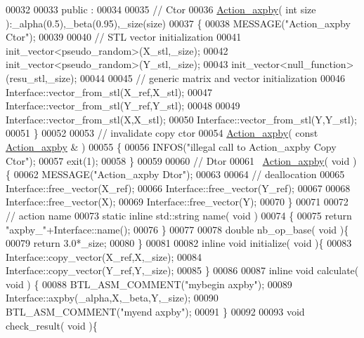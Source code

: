 \begin{DoxyCode}
00032 
00033 public :
00034 
00035   \textcolor{comment}{// Ctor}
00036   \hyperlink{class_action__axpby}{Action\_axpby}( \textcolor{keywordtype}{int} size ):\_alpha(0.5),\_beta(0.95),\_size(size)
00037   \{
00038     MESSAGE(\textcolor{stringliteral}{"Action\_axpby Ctor"});
00039 
00040     \textcolor{comment}{// STL vector initialization}
00041     init\_vector<pseudo\_random>(X\_stl,\_size);
00042     init\_vector<pseudo\_random>(Y\_stl,\_size);
00043     init\_vector<null\_function>(resu\_stl,\_size);
00044 
00045     \textcolor{comment}{// generic matrix and vector initialization}
00046     Interface::vector\_from\_stl(X\_ref,X\_stl);
00047     Interface::vector\_from\_stl(Y\_ref,Y\_stl);
00048 
00049     Interface::vector\_from\_stl(X,X\_stl);
00050     Interface::vector\_from\_stl(Y,Y\_stl);
00051   \}
00052 
00053   \textcolor{comment}{// invalidate copy ctor}
00054   \hyperlink{class_action__axpby}{Action\_axpby}( \textcolor{keyword}{const}  \hyperlink{class_action__axpby}{Action\_axpby} & )
00055   \{
00056     INFOS(\textcolor{stringliteral}{"illegal call to Action\_axpby Copy Ctor"});
00057     exit(1);
00058   \}
00059 
00060   \textcolor{comment}{// Dtor}
00061   ~\hyperlink{class_action__axpby}{Action\_axpby}( \textcolor{keywordtype}{void} )\{
00062     MESSAGE(\textcolor{stringliteral}{"Action\_axpby Dtor"});
00063 
00064     \textcolor{comment}{// deallocation}
00065     Interface::free\_vector(X\_ref);
00066     Interface::free\_vector(Y\_ref);
00067 
00068     Interface::free\_vector(X);
00069     Interface::free\_vector(Y);
00070   \}
00071 
00072   \textcolor{comment}{// action name}
00073   \textcolor{keyword}{static} \textcolor{keyword}{inline} std::string name( \textcolor{keywordtype}{void} )
00074   \{
00075     \textcolor{keywordflow}{return} \textcolor{stringliteral}{"axpby\_"}+Interface::name();
00076   \}
00077 
00078   \textcolor{keywordtype}{double} nb\_op\_base( \textcolor{keywordtype}{void} )\{
00079     \textcolor{keywordflow}{return} 3.0*\_size;
00080   \}
00081 
00082   \textcolor{keyword}{inline} \textcolor{keywordtype}{void} initialize( \textcolor{keywordtype}{void} )\{
00083     Interface::copy\_vector(X\_ref,X,\_size);
00084     Interface::copy\_vector(Y\_ref,Y,\_size);
00085   \}
00086 
00087   \textcolor{keyword}{inline} \textcolor{keywordtype}{void} calculate( \textcolor{keywordtype}{void} ) \{
00088     BTL\_ASM\_COMMENT(\textcolor{stringliteral}{"mybegin axpby"});
00089     Interface::axpby(\_alpha,X,\_beta,Y,\_size);
00090     BTL\_ASM\_COMMENT(\textcolor{stringliteral}{"myend axpby"});
00091   \}
00092 
00093   \textcolor{keywordtype}{void} check\_result( \textcolor{keywordtype}{void} )\{

\end{DoxyCode}
